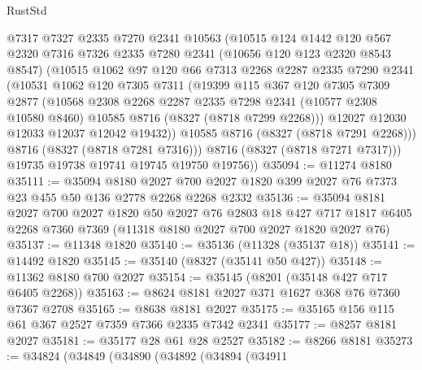 \begin{lexlean}{RustStd}
\begin{coremodule}
{\begin{coremodule}
{{{{{{{{{{{{{{{{{{{{{{{{{{{{{{{{{{{{{{{{{{{{{{{{{{{{{{          @7317
          @7327
          @2335
          @7270
          @2341
          @10563
          (@10515
            @124
            @1442
            @120
            @567
            @2320
            @7316
            @7326
            @2335
            @7280
            @2341
            (@10656 @120 @123 @2320 @8543 @8547)
            (@10515
              @1062
              @97
              @120
              @66
              @7313
              @2268
              @2287
              @2335
              @7290
              @2341
              (@10531
                @1062
                @120
                @7305
                @7311
                (@19399
                  @115
                  @367
                  @120
                  @7305
                  @7309
                  @2877
                  (@10568
                    @2308
                    @2268
                    @2287
                    @2335
                    @7298
                    @2341
                    (@10577 @2308 @10580 @8460)
                    @10585
                    @8716
                    (@8327 (@8718 @7299 @2268)))
                  @12027
                  @12030
                  @12033
                  @12037
                  @12042
                  @19432))
              @10585
              @8716
              (@8327 (@8718 @7291 @2268)))
            @8716
            (@8327 (@8718 @7281 @7316)))
          @8716
          (@8327 (@8718 @7271 @7317)))
        @19735
        @19738
        @19741
        @19745
        @19750
        @19756))
@35094 := @11274 @8180
@35111 := @35094
    @8180
    @2027
    @700
    @2027
    @1820
    @399
    @2027
    @76
    @7373
    @23
    @455
    @50
    @136
    @2778
    @2268
    @2268
    @2332
@35136 := @35094
    @8181
    @2027
    @700
    @2027
    @1820
    @50
    @2027
    @76
    @2803
    @18
    @427
    @717
    @1817
    @6405
    @2268
    @7360
    @7369
    (@11318 @8180 @2027 @700 @2027 @1820 @2027 @76)
@35137 := @11348 @1820
@35140 := @35136 (@11328 (@35137 @18))
@35141 := @14492 @1820
@35145 := @35140 (@8327 (@35141 @50 @427))
@35148 := @11362 @8180 @700 @2027
@35154 := @35145 (@8201 (@35148 @427 @717 @6405 @2268))
@35163 := @8624 @8181 @2027 @371 @1627 @368 @76 @7360 @7367 @2708
@35165 := @8638 @8181 @2027
@35175 := @35165 @156 @115 @61 @367 @2527 @7359 @7366 @2335 @7342 @2341
@35177 := @8257 @8181 @2027
@35181 := @35177 @28 @61 @28 @2527
@35182 := @8266 @8181
@35273 := @34824
    (@34849
      (@34890
        (@34892
          (@34894
            (@34911
}}}}}}}}}}}}}}}}}}}}}}}}}}}}}}}}}}}}}}}}}}}}}}}}}}}}}}
\end{coremodule}}
\end{coremodule}
\end{lexlean}

